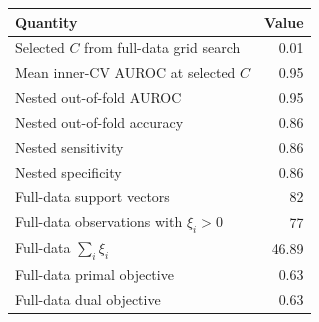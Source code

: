\begin{tabular}{lr}
\toprule
Quantity & Value \\
\midrule
Selected $C$ from full-data grid search & 0.01 \\
Mean inner-CV AUROC at selected $C$ & 0.95 \\
Nested out-of-fold AUROC & 0.95 \\
Nested out-of-fold accuracy & 0.86 \\
Nested sensitivity & 0.86 \\
Nested specificity & 0.86 \\
Full-data support vectors & 82 \\
Full-data observations with $\xi_i>0$ & 77 \\
Full-data $\sum_i\xi_i$ & 46.89 \\
Full-data primal objective & 0.63 \\
Full-data dual objective & 0.63 \\
\bottomrule
\end{tabular}
